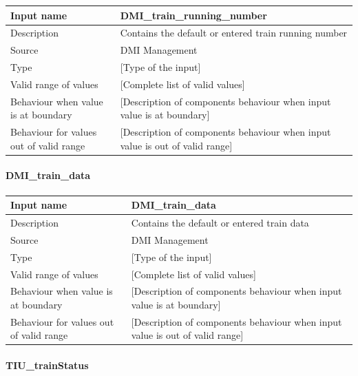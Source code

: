 \begin{longtable}{p{}p{}}
\toprule
Input name				& DMI\_train\_running\_number \\
\midrule
Description				& Contains the default or entered train running number \\
\midrule
Source					& DMI Management \\ 
\midrule
Type					& [Type of the input] \\
\midrule
Valid range of values	& [Complete list of valid values] \\
\midrule
Behaviour when value is at boundary	& [Description of components behaviour when input value is at boundary] \\
\midrule
Behaviour for values out of valid range	& [Description of components behaviour when input value is out of valid range] \\
\bottomrule
\end{longtable}

\paragraph{DMI\_train\_data}

\begin{longtable}{p{}p{}}
\toprule
Input name				& DMI\_train\_data \\
\midrule
Description				& Contains the default or entered train data \\
\midrule
Source					& DMI Management \\ 
\midrule
Type					& [Type of the input] \\
\midrule
Valid range of values	& [Complete list of valid values] \\
\midrule
Behaviour when value is at boundary	& [Description of components behaviour when input value is at boundary] \\
\midrule
Behaviour for values out of valid range	& [Description of components behaviour when input value is out of valid range] \\
\bottomrule
\end{longtable}

\paragraph{TIU\_trainStatus}

